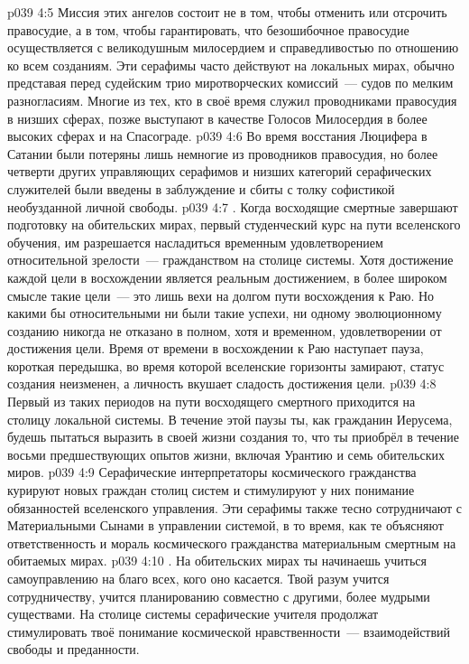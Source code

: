 \vs p039 4:5 Миссия этих ангелов состоит не в том, чтобы отменить или отсрочить правосудие, а в том, чтобы гарантировать, что безошибочное правосудие осуществляется с великодушным милосердием и справедливостью по отношению ко всем созданиям. Эти серафимы часто действуют на локальных мирах, обычно представая перед судейским трио миротворческих комиссий~--- судов по мелким разногласиям. Многие из тех, кто в своё время служил проводниками правосудия в низших сферах, позже выступают в качестве Голосов Милосердия в более высоких сферах и на Спасограде.
\vs p039 4:6 Во время восстания Люцифера в Сатании были потеряны лишь немногие из проводников правосудия, но более четверти других управляющих серафимов и низших категорий серафических служителей были введены в заблуждение и сбиты с толку софистикой необузданной личной свободы.
\vs p039 4:7 . Когда восходящие смертные завершают подготовку на обительских мирах, первый студенческий курс на пути вселенского обучения, им разрешается насладиться временным удовлетворением относительной зрелости~--- гражданством на столице системы. Хотя достижение каждой цели в восхождении является реальным достижением, в более широком смысле такие цели~--- это лишь вехи на долгом пути восхождения к Раю. Но какими бы относительными ни были такие успехи, ни одному эволюционному созданию никогда не отказано в полном, хотя и временном, удовлетворении от достижения цели. Время от времени в восхождении к Раю наступает пауза, короткая передышка, во время которой вселенские горизонты замирают, статус создания неизменен, а личность вкушает сладость достижения цели.
\vs p039 4:8 Первый из таких периодов на пути восходящего смертного приходится на столицу локальной системы. В течение этой паузы ты, как гражданин Иерусема, будешь пытаться выразить в своей жизни создания то, что ты приобрёл в течение восьми предшествующих опытов жизни, включая Урантию и семь обительских миров.
\vs p039 4:9 Серафические интерпретаторы космического гражданства курируют новых граждан столиц систем и стимулируют у них понимание обязанностей вселенского управления. Эти серафимы также тесно сотрудничают с Материальными Сынами в управлении системой, в то время, как те объясняют ответственность и мораль космического гражданства материальным смертным на обитаемых мирах.
\vs p039 4:10 . На обительских мирах ты начинаешь учиться самоуправлению на благо всех, кого оно касается. Твой разум учится сотрудничеству, учится планированию совместно с другими, более мудрыми существами. На столице системы серафические учителя продолжат стимулировать твоё понимание космической нравственности~--- взаимодействий свободы и преданности.

